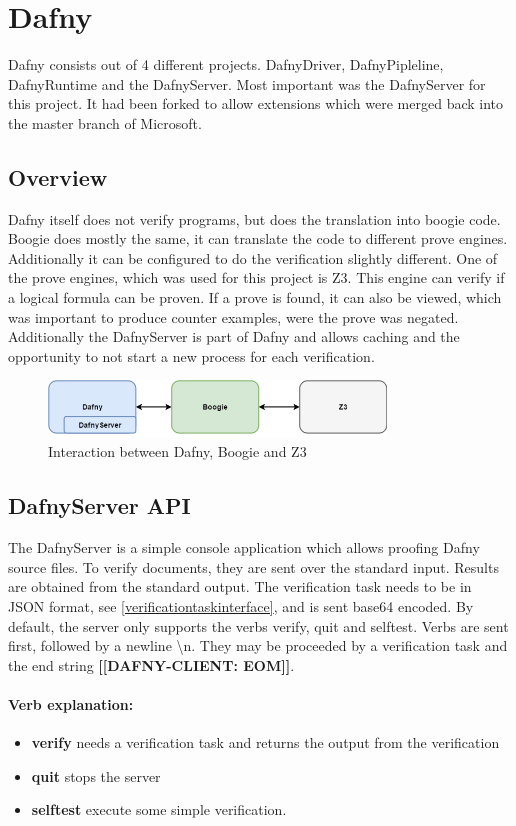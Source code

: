 \section{Dafny}
Dafny consists out of 4 different projects. DafnyDriver, DafnyPipleline, DafnyRuntime and the DafnyServer. Most important was the DafnyServer for this project. It had been forked to allow extensions which were merged back into the master branch of Microsoft. 
\subsection{Overview}
Dafny itself does not verify programs, but does the translation into boogie code. Boogie does mostly the same, it can translate the code to different prove engines. Additionally it can be configured to do the verification slightly different. One of the prove engines, which was used for this project is Z3. This engine can verify if a logical formula can be proven. If a prove is found, it can also be viewed, which was important to produce counter examples, were the prove was negated. 
Additionally the DafnyServer is part of Dafny and allows caching and the opportunity to not start a new process for each verification.\newline 
\begin{figure}[H]
	\centering
	\includegraphics[width=0.8\textwidth]{img/dafny_overview}
	\caption{Interaction between Dafny, Boogie and Z3}
	\label{fig:dafny_overview}
\end{figure}
\subsection{DafnyServer API}
The DafnyServer is a simple console application which allows proofing Dafny source files. To verify documents, they are sent over the standard input. Results are obtained from the standard output. The verification task needs to be in JSON format, see \ref{verificationtaskinterface}, and is sent base64 encoded. By default, the server only supports the verbs verify, quit and selftest. Verbs are sent first, followed by a newline \textbackslash{n}. They may be proceeded by a verification task and the end string \textbf{[[DAFNY-CLIENT: EOM]]}. 
\paragraph{Verb explanation:}
\begin{itemize}
	\item \textbf{verify} needs a verification task and returns the output from the verification
	\item \textbf{quit} stops the server
	\item \textbf{selftest} execute some simple verification.
\end{itemize}
